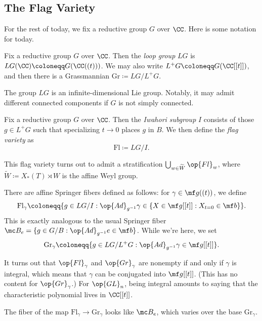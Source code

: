 \documentclass[../notes.tex]{subfiles}
\begin{document}
\subsection{The Flag Variety}
For the rest of today, we fix a reductive group $G$ over $\CC$. Here is some notation for today.
\begin{definition}
	Fix a reductive group $G$ over $\CC$. Then the \textit{loop group} $LG$ is $LG(\CC)\coloneqq G(\CC((t)))$. We may also write $L^+G\coloneqq G(\CC[[t]])$, and then there is a Grassmannian $\mathrm{Gr}\coloneqq LG/L^+G$.
\end{definition}
\begin{remark}
	The group $LG$ is an infinite-dimensional Lie group. Notably, it may admit different connected components if $G$ is not simply connected.
\end{remark}
\begin{definition}
	Fix a reductive group $G$ over $\CC$. Then the \textit{Iwahori subgroup} $I$ consists of those $g\in L^+G$ such that specializing $t\to0$ places $g$ in $B$. We then define the \textit{flag variety} as
	\[\mathrm{Fl}\coloneqq LG/I.\]
\end{definition}
\begin{remark}
	This flag variety turns out to admit a stratification $\bigcup_{w\in\widetilde W}\op{Fl}_w$, where $\widetilde W\coloneqq X_*(T)\rtimes W$ is the affine Weyl group.
\end{remark}
\begin{notation}
	There are affine Springer fibers defined as follows: for $\gamma\in\mf g((t))$, we define
	\[\mathrm{Fl}_\gamma\coloneqq\{g\in LG/I:\op{Ad}_{g^{-1}}\gamma\in\{X\in\mf g[[t]]:X_{t=0}\in\mf b\}\}.\]
	This is exactly analogous to the usual Springer fiber $\mc B_e=\{g\in G/B:\op{Ad}_{g^{-1}}e\in\mf b\}$. While we're here, we set
	\[\mathrm{Gr}_\gamma\coloneqq\{g\in LG/L^+G:\op{Ad}_{g^{-1}}\gamma\in\mf g[[t]]\}.\]
\end{notation}
\begin{remark}
	It turns out that $\op{Fl}_\gamma$ and $\op{Gr}_\gamma$ are nonempty if and only if $\gamma$ is integral, which means that $\gamma$ can be conjugated into $\mf g[[t]]$. (This has no content for $\op{Gr}_\gamma$.) For $\op{GL}_n$, being integral amounts to saying that the characteristic polynomial lives in $\CC[[t]]$.
\end{remark}
\begin{remark}
	The fiber of the map $\mathrm{Fl}_\gamma\to\mathrm{Gr}_\gamma$ looks like $\mc B_e$, which varies over the base $\mathrm{Gr}_\gamma$.
\end{remark}
\end{document}
